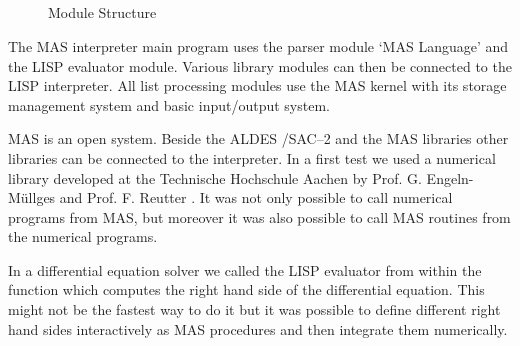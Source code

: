 \begin{figure}[thbp] %
\begin{center}
        \\ 
        \\ 
        \\ 
        \\ 
        \\ 
        \makebox[4cm]{ } \\ 
        \makebox[4cm]{ } \\ 
        \makebox[4cm]{ }
        \makebox[4cm]{ } \\ 
        \makebox[2.1cm]{ } \\ 
\end{center}
\caption{Module Structure}
\label{figMSt}
\end{figure} %

The MAS interpreter main program uses the parser module
`MAS Language' and the LISP evaluator module. 
Various library modules can then be connected to 
the LISP interpreter.
All list processing modules use the MAS kernel 
with its storage management system and basic input/output system.

MAS is an open system. Beside the ALDES /SAC--2 and the MAS
libraries other libraries can be connected to the interpreter.
In a first test we used a numerical 
library developed
at the Technische Hochschule Aachen by 
Prof. G. Engeln-M\"ullges and   
Prof. F. Reutter \cite{Engeln 88}. 
It was not only possible to call numerical
programs from MAS, but moreover it was also possible to call
MAS routines from the numerical programs. 

In a differential equation solver we called the 
LISP evaluator from within the function which computes the 
right hand side of the differential equation.    
This might not be the fastest way to do it but it was possible to 
define different right hand sides interactively 
as MAS procedures and then integrate them numerically. 

